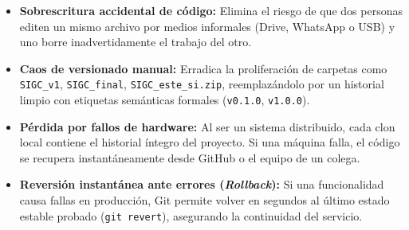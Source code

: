 \begin{itemize}\setlength\itemsep{0.2em}
    \item \textbf{Sobrescritura accidental de código:} Elimina el riesgo de que dos personas editen un mismo archivo por medios informales (Drive, WhatsApp o USB) y uno borre inadvertidamente el trabajo del otro.
    \item \textbf{Caos de versionado manual:} Erradica la proliferación de carpetas como \texttt{SIGC\_v1}, \texttt{SIGC\_final}, \texttt{SIGC\_este\_si.zip}, reemplazándolo por un historial limpio con etiquetas semánticas formales (\texttt{v0.1.0}, \texttt{v1.0.0}).
    \item \textbf{Pérdida por fallos de hardware:} Al ser un sistema distribuido, cada clon local contiene el historial íntegro del proyecto. Si una máquina falla, el código se recupera instantáneamente desde GitHub o el equipo de un colega.
    \item \textbf{Reversión instantánea ante errores (\textit{Rollback}):} Si una funcionalidad causa fallas en producción, Git permite volver en segundos al último estado estable probado (\texttt{git revert}), asegurando la continuidad del servicio.
\end{itemize}
